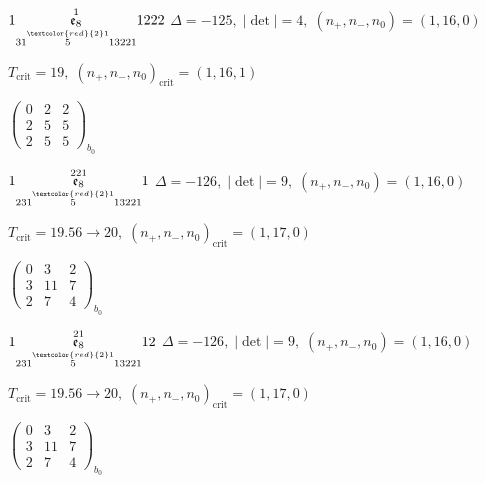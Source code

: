 \documentclass[10pt]{article}
\begin{document}
\smallskip

$1\overset{1}{\underset{31\overset{\textcolor{red}{2}1}{5}13221}{\mathfrak{e}_8}}1222$ \quad $\Delta=-125,\; |\det|=4,\; (n_+,n_-,n_0)=(1,16,0)$

\hspace{1em}$T_{\text{crit}}=19,\; (n_+,n_-,n_0)_{\text{crit}}=(1,16,1)$

\hspace{2em}$\left(\begin{smallmatrix}0 & 2 & 2 \\ 2 & 5 & 5 \\ 2 & 5 & 5\end{smallmatrix}\right)_{\!b_0}$

\smallskip

$1\overset{221}{\underset{231\overset{\textcolor{red}{2}1}{5}13221}{\mathfrak{e}_8}}1$ \quad $\Delta=-126,\; |\det|=9,\; (n_+,n_-,n_0)=(1,16,0)$

\hspace{1em}$T_{\text{crit}}=19.56 \to 20,\; (n_+,n_-,n_0)_{\text{crit}}=(1,17,0)$

\hspace{2em}$\left(\begin{smallmatrix}0 & 3 & 2 \\ 3 & 11 & 7 \\ 2 & 7 & 4\end{smallmatrix}\right)_{\!b_0}$

\smallskip

$1\overset{21}{\underset{231\overset{\textcolor{red}{2}1}{5}13221}{\mathfrak{e}_8}}12$ \quad $\Delta=-126,\; |\det|=9,\; (n_+,n_-,n_0)=(1,16,0)$

\hspace{1em}$T_{\text{crit}}=19.56 \to 20,\; (n_+,n_-,n_0)_{\text{crit}}=(1,17,0)$

\hspace{2em}$\left(\begin{smallmatrix}0 & 3 & 2 \\ 3 & 11 & 7 \\ 2 & 7 & 4\end{smallmatrix}\right)_{\!b_0}$

\smallskip
\end{document}
